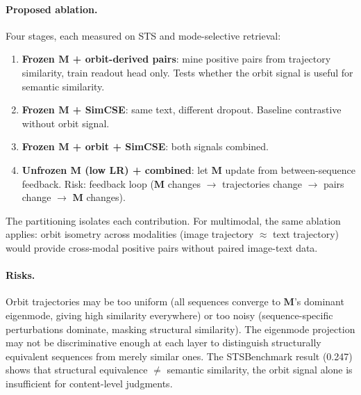 \documentclass[11pt, a4paper]{article}
\newcommand{\M}{\mathbf{M}}
\theoremstyle{plain}
\theoremstyle{remark}
\begin{document}
\paragraph{Proposed ablation.}
Four stages, each measured on STS and mode-selective retrieval:
\begin{enumerate}[nosep]
    \item \textbf{Frozen $\M$ + orbit-derived pairs}: mine positive pairs from trajectory similarity, train readout head only.
    Tests whether the orbit signal is useful for semantic similarity.
    \item \textbf{Frozen $\M$ + SimCSE}: same text, different dropout.
    Baseline contrastive without orbit signal.
    \item \textbf{Frozen $\M$ + orbit + SimCSE}: both signals combined.
    \item \textbf{Unfrozen $\M$ (low LR) + combined}: let $\M$ update from between-sequence feedback.
    Risk: feedback loop ($\M$ changes $\to$ trajectories change $\to$ pairs change $\to$ $\M$ changes).
\end{enumerate}

The partitioning isolates each contribution.
For multimodal, the same ablation applies: orbit isometry across modalities (image trajectory $\approx$ text trajectory) would provide cross-modal positive pairs without paired image-text data.

\paragraph{Risks.}
Orbit trajectories may be too uniform (all sequences converge to $\M$'s dominant eigenmode, giving high similarity everywhere) or too noisy (sequence-specific perturbations dominate, masking structural similarity).
The eigenmode projection may not be discriminative enough at each layer to distinguish structurally equivalent sequences from merely similar ones.
The STSBenchmark result (0.247) shows that structural equivalence $\neq$ semantic similarity, the orbit signal alone is insufficient for content-level judgments.
\end{document}
